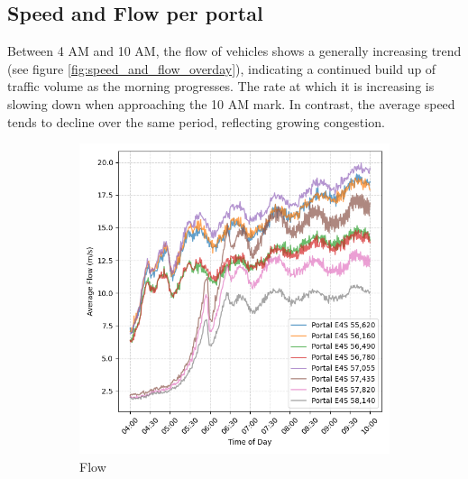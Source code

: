 	\subsection{Speed and Flow per portal}
	Between 4 AM and 10 AM, the flow of vehicles shows a generally increasing trend (see figure \ref{fig:speed_and_flow_overday}), indicating a continued build up of traffic volume as the morning progresses. The rate at which it is increasing is slowing down when approaching the 10 AM mark. In contrast, the average speed tends to decline over the same period, reflecting growing congestion.
		\begin{figure}[H]
		\centering
		\begin{subfigure}{0.49 \linewidth}
			\includegraphics[width=\textwidth]{../Plots/Flow/flow_comparison_portals}
			\caption{Flow}
		\end{subfigure}
		\begin{subfigure}{0.49 \linewidth}

\end{subfigure}
\end{figure}
